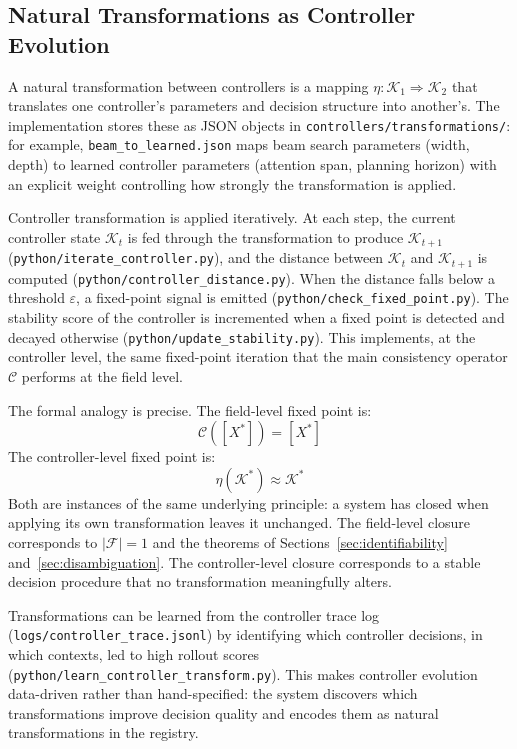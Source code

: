 \documentclass[11pt, oneside]{article}
\begin{document}
\subsection{Natural Transformations as Controller Evolution}

A natural transformation between controllers is a mapping
$\eta : \mathcal{K}_1 \Rightarrow \mathcal{K}_2$ that translates one controller's
parameters and decision structure into another's. The implementation stores these as
JSON objects in \texttt{controllers/transformations/}: for example,
\texttt{beam\_to\_learned.json} maps beam search parameters (width, depth) to learned
controller parameters (attention span, planning horizon) with an explicit weight
controlling how strongly the transformation is applied.

Controller transformation is applied iteratively. At each step, the current controller
state $\mathcal{K}_t$ is fed through the transformation to produce $\mathcal{K}_{t+1}$
(\texttt{python/iterate\_controller.py}), and the distance between $\mathcal{K}_t$ and
$\mathcal{K}_{t+1}$ is computed (\texttt{python/controller\_distance.py}). When the
distance falls below a threshold $\varepsilon$, a fixed-point signal is emitted
(\texttt{python/check\_fixed\_point.py}). The stability score of the controller is
incremented when a fixed point is detected and decayed otherwise
(\texttt{python/update\_stability.py}). This implements, at the controller level, the
same fixed-point iteration that the main consistency operator $\mathcal{C}$ performs at
the field level.

The formal analogy is precise. The field-level fixed point is:
\[
\mathcal{C}([X^*]) = [X^*]
\]
The controller-level fixed point is:
\[
\eta(\mathcal{K}^*) \approx \mathcal{K}^*
\]
Both are instances of the same underlying principle: a system has closed when applying
its own transformation leaves it unchanged. The field-level closure corresponds to
$|\mathcal{F}| = 1$ and the theorems of Sections~\ref{sec:identifiability}
and~\ref{sec:disambiguation}. The controller-level closure corresponds to a stable
decision procedure that no transformation meaningfully alters.

Transformations can be learned from the controller trace log
(\texttt{logs/controller\_trace.jsonl}) by identifying which controller decisions, in
which contexts, led to high rollout scores (\texttt{python/learn\_controller\_transform.py}).
This makes controller evolution data-driven rather than hand-specified: the system
discovers which transformations improve decision quality and encodes them as natural
transformations in the registry.
\end{document}
